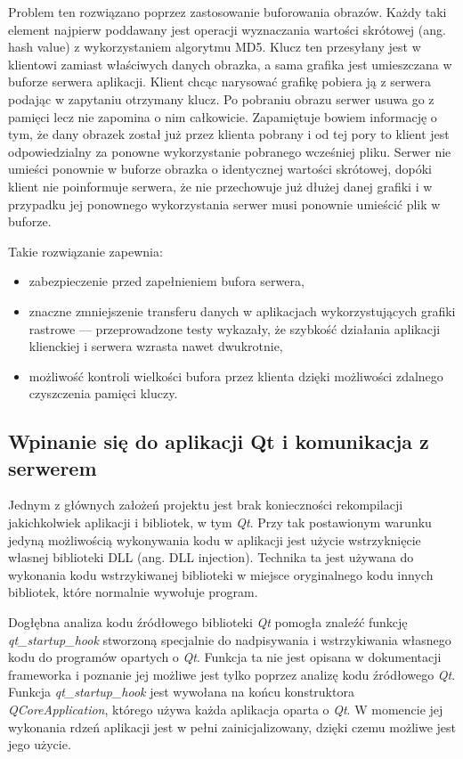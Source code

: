 Problem ten rozwiązano poprzez zastosowanie buforowania obrazów. Każdy taki element najpierw poddawany jest operacji wyznaczania wartości skrótowej (ang. hash value) z wykorzystaniem algorytmu MD5. Klucz ten przesyłany jest w klientowi zamiast właściwych danych obrazka, a sama grafika jest umieszczana w buforze serwera aplikacji. Klient chcąc narysować grafikę pobiera ją z serwera podając w zapytaniu otrzymany klucz. Po pobraniu obrazu serwer usuwa go z pamięci lecz nie zapomina o nim całkowicie. Zapamiętuje bowiem informację o tym, że dany obrazek został już przez klienta pobrany i od tej pory to klient jest odpowiedzialny za ponowne wykorzystanie pobranego wcześniej pliku. Serwer nie umieści ponownie w buforze obrazka o identycznej wartości skrótowej, dopóki klient nie poinformuje serwera, że nie przechowuje już dłużej danej grafiki i w przypadku jej ponownego wykorzystania serwer musi ponownie umieścić plik w buforze. 

Takie rozwiązanie zapewnia:
\begin{itemize}
\item zabezpieczenie przed zapełnieniem bufora serwera,
\item znaczne zmniejszenie transferu danych w aplikacjach wykorzystujących grafiki rastrowe --- przeprowadzone testy wykazały, że szybkość działania aplikacji klienckiej i serwera wzrasta nawet dwukrotnie,
\item możliwość kontroli wielkości bufora przez klienta dzięki możliwości zdalnego czyszczenia pamięci kluczy.
\end{itemize}

\subsection{Wpinanie się do aplikacji Qt i komunikacja z serwerem}
Jednym z głównych założeń projektu jest brak konieczności rekompilacji jakichkolwiek aplikacji i bibliotek, w tym \emph{Qt}. Przy tak postawionym warunku jedyną możliwością wykonywania kodu w aplikacji jest użycie wstrzyknięcie własnej biblioteki DLL (ang. DLL injection). Technika ta jest używana do wykonania kodu wstrzykiwanej biblioteki w miejsce oryginalnego kodu innych bibliotek, które normalnie wywołuje program.

Dogłębna analiza kodu źródłowego biblioteki \emph{Qt} pomogła znaleźć funkcję \emph{qt\_startup\_hook} stworzoną specjalnie do nadpisywania i  wstrzykiwania własnego kodu do programów opartych o \emph{Qt}.
Funkcja ta nie jest opisana w dokumentacji frameworka i poznanie jej możliwe jest tylko poprzez analizę kodu źródłowego \emph{Qt}. Funkcja \emph{qt\_startup\_hook} jest wywołana na końcu konstruktora \emph{QCoreApplication}, którego używa każda aplikacja oparta o \emph{Qt}. W momencie jej wykonania rdzeń aplikacji jest w pełni zainicjalizowany, dzięki czemu możliwe jest jego użycie.

